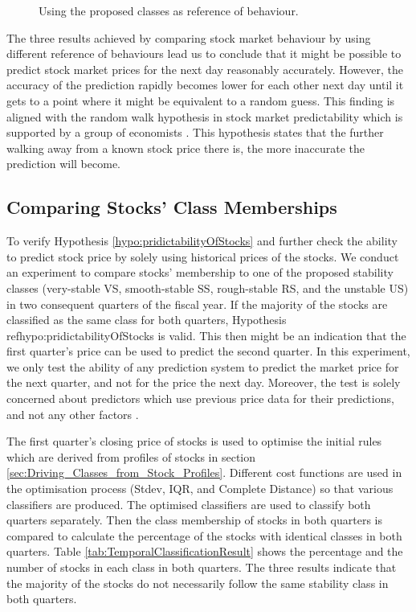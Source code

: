 \begin{figure}[!h]
{\begin{minipage}{\dimexpr \textwidth-2\fboxsep-2\fboxrule}
    \end{minipage}}
    \caption{Using the proposed classes as reference of behaviour.}
    \label{fig:ChangeMeasuers_Class_Stock}
\end{figure}

The three results achieved by comparing stock market behaviour by using different reference of behaviours lead us to conclude that it might be possible to predict stock market prices for the next day reasonably accurately. However, the accuracy of the prediction rapidly becomes lower for each other next day until it gets to a point where it might be equivalent to a random guess. This finding is aligned with the random walk hypothesis in stock market predictability which is supported by a group of economists  \cite{Fama1965}. This hypothesis states that the further walking away from a known stock price there is, the more inaccurate the prediction will become.


\subsection{Comparing Stocks' Class Memberships}

To verify Hypothesis \ref{hypo:pridictabilityOfStocks} and further check the ability to predict stock price by solely using historical prices of the stocks. We conduct an experiment to compare stocks' membership to one of the proposed stability classes (very-stable VS, smooth-stable SS, rough-stable RS, and the unstable US) in two consequent quarters of the fiscal year. If the majority of the stocks are classified as the same class for both quarters, Hypothesis ref{hypo:pridictabilityOfStocks} is valid. This then might be an indication that the first quarter's price can be used to predict the second quarter. In this experiment, we only test the ability of any prediction system to predict the market price for the next quarter, and not for the price the next day. Moreover, the test is solely concerned about predictors which use previous price data for their predictions, and not any other factors \cite{Agrawal2013}.

The first quarter's closing price of stocks is used to optimise the initial rules which are derived from profiles of stocks in section \ref{sec:Driving_Classes_from_Stock_Profiles}. Different cost functions are used in the optimisation process (Stdev, IQR, and Complete Distance) so that various classifiers are produced. The optimised classifiers are used to classify both quarters separately. Then the class membership of stocks in both quarters is compared to calculate the percentage of the stocks with identical classes in both quarters. Table \ref{tab:TemporalClassificationResult} shows the percentage and the number of stocks in each class in both quarters. The three results indicate that the majority of the stocks do not necessarily follow the same stability class in both quarters. 

